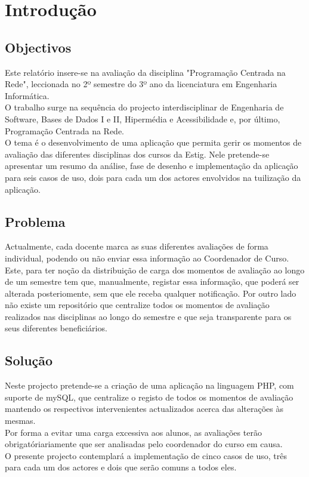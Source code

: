 

\chapter{Introdução}

\paragraph{}

\section{Objectivos}
Este relatório insere-se na avaliação da disciplina "Programação Centrada na Rede", leccionada no 2º semestre do 3º ano da licenciatura em Engenharia Informática.\\ 
O trabalho surge na sequência do projecto interdisciplinar de Engenharia de Software, Bases de Dados I e II, Hipermédia e Acessibilidade e, por último, Programação Centrada na Rede.\\
O tema é o desenvolvimento de uma aplicação que permita gerir os momentos de avaliação das diferentes disciplinas dos cursos da Estig.
Nele pretende-se apresentar um resumo da análise, fase de desenho e implementação da aplicação para seis casos de uso, dois para cada um dos actores envolvidos na tuilização da aplicação.\\

\section{Problema}
Actualmente, cada docente marca as suas diferentes avaliações de forma individual, podendo ou não enviar essa informação ao Coordenador de Curso. Este, para ter noção da distribuição de carga dos momentos de avaliação ao longo de um semestre tem que, manualmente, registar essa informação, que poderá ser alterada posteriomente, sem que ele receba qualquer notificação. Por outro lado não existe um repositório que centralize todos os momentos de avaliação realizados nas disciplinas ao longo do semestre e que seja transparente para os seus diferentes beneficiários.

\section{Solução}
Neste projecto pretende-se a criação de uma aplicação na linguagem PHP, com suporte de mySQL, que centralize o registo de todos os momentos de avaliação mantendo os respectivos intervenientes actualizados acerca das alterações às mesmas.\\
Por forma a evitar uma carga excessiva aos alunos, as avaliações terão obrigatóriariamente que ser analisadas pelo coordenador do curso em causa.\\
O presente projecto contemplará a implementação de cinco casos de uso, três para cada um dos actores e dois que serão comuns a todos eles.\\


